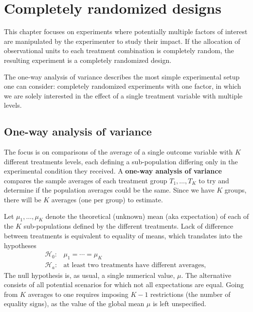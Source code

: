 \documentclass[
  11pt,
  letterpaper,
]{scrbook}
\theoremstyle{definition}
\theoremstyle{remark}
\begin{document}

\hypertarget{CRT}{%
\chapter{Completely randomized designs}\label{CRT}}

This chapter focuses on experiments where potentially multiple factors
of interest are manipulated by the experimenter to study their impact.
If the allocation of observational units to each treatment combination
is completely random, the resulting experiment is a completely
randomized design.

The one-way analysis of variance describes the most simple experimental
setup one can consider: completely randomized experiments with one
factor, in which we are solely interested in the effect of a single
treatment variable with multiple levels.

\hypertarget{one-way-analysis-of-variance}{%
\section{One-way analysis of
variance}\label{one-way-analysis-of-variance}}

The focus is on comparisons of the average of a single outcome variable
with \(K\) different treatments levels, each defining a sub-population
differing only in the experimental condition they received. A
\textbf{one-way analysis of variance} compares the sample averages of
each treatment group \(T_1, \ldots, T_K\) to try and determine if the
population averages could be the same. Since we have \(K\) groups, there
will be \(K\) averages (one per group) to estimate.

Let \(\mu_1, \ldots, \mu_K\) denote the theoretical (unknown) mean (aka
expectation) of each of the \(K\) sub-populations defined by the
different treatments. Lack of difference between treatments is
equivalent to equality of means, which translates into the hypotheses
\begin{align*}
\mathscr{H}_0: & \mu_1 = \cdots = \mu_K \\
\mathscr{H}_a: & \text{at least two treatments have different averages, }
\end{align*} The null hypothesis is, as usual, a single numerical value,
\(\mu\). The alternative consists of all potential scenarios for which
not all expectations are equal. Going from \(K\) averages to one
requires imposing \(K-1\) restrictions (the number of equality signs),
as the value of the global mean \(\mu\) is left unspecified.
\end{document}
